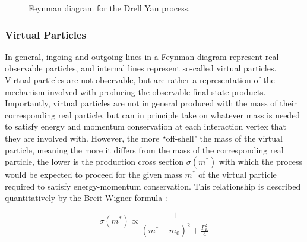 \begin{figure}[hp]
	\centering
	\caption{Feynman diagram for the Drell Yan process.}
	\label{fig:drell_yan}
\end{figure}

\subsubsection{Virtual Particles}
\label{sec:virtual_particles}

In general, ingoing and outgoing lines in a Feynman diagram represent real observable particles, and internal lines represent so-called virtual particles. Virtual particles are not observable, but are rather a representation of the mechanism involved with producing the observable final state products. Importantly, virtual particles are not in general produced with the mass of their corresponding real particle, but can in principle take on whatever mass is needed to satisfy energy and momentum conservation at each interaction vertex that they are involved with. However, the more ``off-shell" the mass of the virtual particle, meaning the more it differs from the mass of the corresponding real particle, the lower is the production cross section \(\sigma(m^{*})\) with which the process would be expected to proceed for the given mass \(m^{*}\) of the virtual particle required to satisfy energy-momentum conservation. This relationship is described quantitatively by the Breit-Wigner formula \cite{breit_wigner}:

\begin{equation}
\label{eq:breit_wigner}
\sigma(m^{*}) \propto \frac{1}{(m^{*}-m_0)^2 + \frac{\Gamma_E^2}{4}}
\end{equation}

